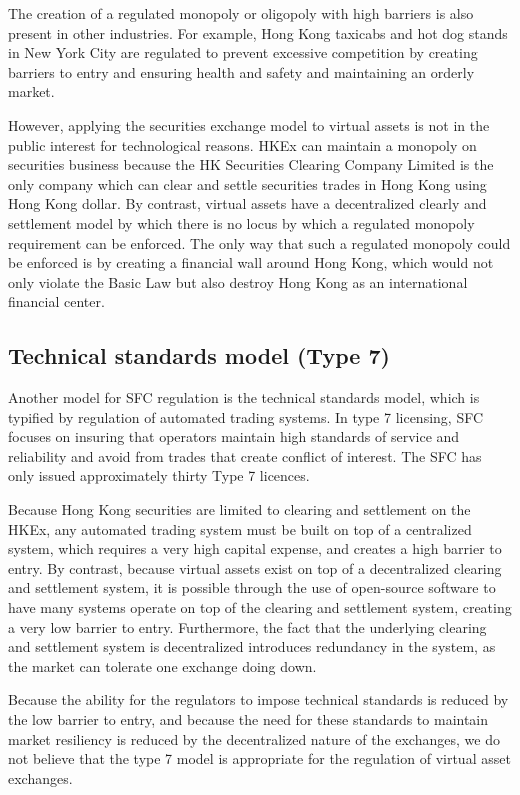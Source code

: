 The creation of a regulated monopoly or oligopoly with high barriers
is also present in other industries.  For example, Hong Kong taxicabs
and hot dog stands in New York City are regulated to
prevent excessive competition by creating barriers to entry and
ensuring health and safety and maintaining an orderly market.

However, applying the securities exchange model to virtual assets is
not in the public interest for technological reasons.  HKEx can
maintain a monopoly on securities business because the HK Securities
Clearing Company Limited is the only company which can clear and
settle securities trades in Hong Kong using Hong Kong dollar.  By
contrast, virtual assets have a decentralized clearly and settlement
model by which there is no locus by which a regulated monopoly
requirement can be enforced.  The only way that such a regulated
monopoly could be enforced is by creating a financial wall around Hong
Kong, which would not only violate the Basic Law but also destroy Hong
Kong as an international financial center.

\subsection{Technical standards model (Type 7)}

Another model for SFC regulation is the technical standards model,
which is typified by regulation of automated trading systems.  In type
7 licensing, SFC focuses on insuring that operators maintain high
standards of service and reliability and avoid from trades that create
conflict of interest.  The SFC has only issued approximately thirty
Type 7 licences.

Because Hong Kong securities are limited to clearing and
settlement on the HKEx, any automated trading system must be built on
top of a centralized system, which requires a very high capital expense, 
and creates a high barrier to entry.  By contrast, because virtual assets 
exist on top of a decentralized clearing and settlement system, it is possible
through the use of open-source software to have many systems
operate on top of the clearing and settlement system, creating a very low
barrier to entry.  Furthermore, the fact that the underlying clearing
and settlement system is decentralized introduces redundancy in the system,
as the market can tolerate one exchange doing down.  

Because the ability for the regulators to impose technical standards is 
reduced by the low barrier to entry, and because the need for these standards
to maintain market resiliency is reduced by the decentralized nature of the
exchanges, we do not believe that the type 7 model is appropriate for the
regulation of virtual asset exchanges.


